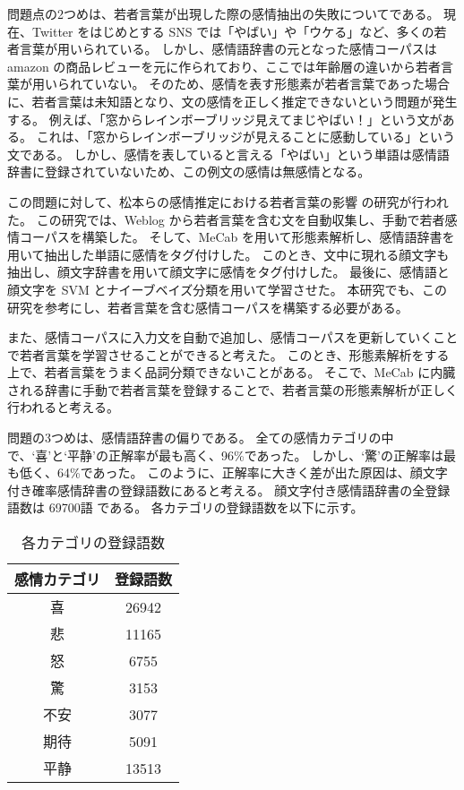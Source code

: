 \documentclass[11pt,a4j]{jsarticle}
\begin{document}
問題点の2つめは、若者言葉が出現した際の感情抽出の失敗についてである。
現在、Twitter をはじめとする SNS では「やばい」や「ウケる」など、多くの若者言葉が用いられている。
しかし、感情語辞書の元となった感情コーパスは amazon の商品レビューを元に作られており、ここでは年齢層の違いから若者言葉が用いられていない。
そのため、感情を表す形態素が若者言葉であった場合に、若者言葉は未知語となり、文の感情を正しく推定できないという問題が発生する。
例えば、「窓からレインボーブリッジ見えてまじやばい！」という文がある。
これは、「窓からレインボーブリッジが見えることに感動している」という文である。
しかし、感情を表していると言える「やばい」という単語は感情語辞書に登録されていないため、この例文の感情は無感情となる。

この問題に対して、松本らの感情推定における若者言葉の影響  の研究が行われた。
この研究では、Weblog から若者言葉を含む文を自動収集し、手動で若者感情コーパスを構築した。
そして、MeCab を用いて形態素解析し、感情語辞書を用いて抽出した単語に感情をタグ付けした。
このとき、文中に現れる顔文字も抽出し、顔文字辞書を用いて顔文字に感情をタグ付けした。
最後に、感情語と顔文字を SVM とナイーブベイズ分類を用いて学習させた。
本研究でも、この研究を参考にし、若者言葉を含む感情コーパスを構築する必要がある。

また、感情コーパスに入力文を自動で追加し、感情コーパスを更新していくことで若者言葉を学習させることができると考えた。
このとき、形態素解析をする上で、若者言葉をうまく品詞分類できないことがある。
そこで、MeCab に内臓される辞書に手動で若者言葉を登録することで、若者言葉の形態素解析が正しく行われると考える。

問題の3つめは、感情語辞書の偏りである。
全ての感情カテゴリの中で、`喜'と`平静'の正解率が最も高く、96\%であった。
しかし、`驚'の正解率は最も低く、64\%であった。
このように、正解率に大きく差が出た原因は、顔文字付き確率感情辞書の登録語数にあると考える。
顔文字付き感情語辞書の全登録語数は 69700語 である。
各カテゴリの登録語数を以下に示す。

\begin{table}[ht]
  \caption{各カテゴリの登録語数}
\centering
\begin{tabular}{c|c} \hline
  感情カテゴリ & 登録語数 \\ \hline \hline
  喜 & 26942 \\ \hline
  悲 & 11165 \\ \hline
  怒 & 6755 \\ \hline
  驚 & 3153 \\ \hline
  不安 & 3077 \\ \hline
  期待 & 5091 \\ \hline
  平静 & 13513 \\ \hline
\end{tabular}
\end{table}
\end{document}

